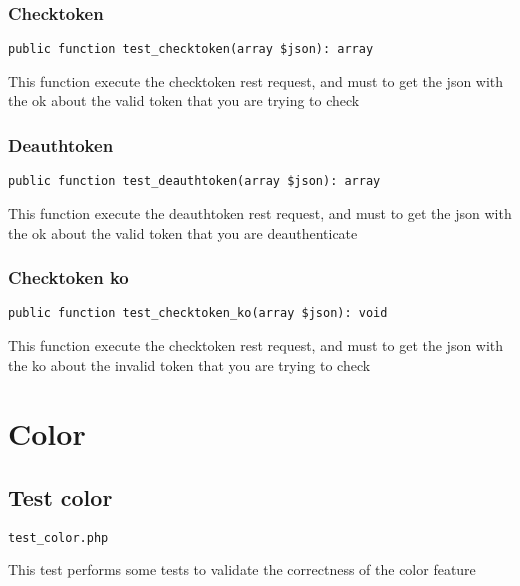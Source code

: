 \documentclass[a4paper]{article}
\begin{document}
\hypertarget{toc88}{}
\subsubsection{Checktoken}

\begin{lstlisting}
public function test_checktoken(array $json): array
\end{lstlisting}

This function execute the checktoken rest request, and must to get the
json with the ok about the valid token that you are trying to check

\hypertarget{toc89}{}
\subsubsection{Deauthtoken}

\begin{lstlisting}
public function test_deauthtoken(array $json): array
\end{lstlisting}

This function execute the deauthtoken rest request, and must to get the
json with the ok about the valid token that you are deauthenticate

\hypertarget{toc90}{}
\subsubsection{Checktoken ko}

\begin{lstlisting}
public function test_checktoken_ko(array $json): void
\end{lstlisting}

This function execute the checktoken rest request, and must to get the
json with the ko about the invalid token that you are trying to check


\hypertarget{toc91}{}
\section{Color}

\hypertarget{toc92}{}
\subsection{Test color}

\begin{lstlisting}
test_color.php
\end{lstlisting}

This test performs some tests to validate the correctness
of the color feature
\end{document}
